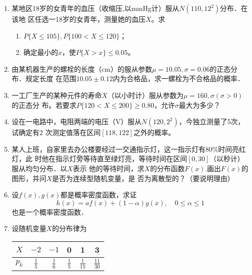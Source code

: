 \documentclass[10pt,a4paper]{article}
\begin{document}
\begin{enumerate}
    \item 某地区18岁的女青年的血压（收缩压,以mmHg计）服从$N(110,12^2)$分布．在该地
    区任选一18岁的女青年，测量她的血压$X$。求
    \begin{enumerate}
        \item $P\{X\leq 105\},P\{100<X\leq 120\}$；
        \item 确定最小的$x$，使$P\{X>x\}\leq 0.05$。
    \end{enumerate}


    \item 由某机器生产的螺栓的长度（cm）的服从参数$\mu=10.05,\sigma=0.06$的正态分布．规定长度
    在范围$10.05\pm 0.12$内为合格品，求一螺栓为不合格品的概率．


    \item 一工厂生产的某种元件的寿命$X$（以小时计）服从参数为$\mu=160,\sigma(\sigma >0)$的正态分
    布。若要求$P\{120<X\leq 200\}\geq 0.80$，允许$\sigma$最大为多少？



    \item 设在一电路中，电阻两端的电压（V）服从$N(120,2^2)$，今独立测量了5次，试确定有2
    次测定值落在区间$[118,122]$之外的概率。


    \item 某人上班，自家里去办公楼要经过一交通指示灯，这一指示灯有80\%时间亮红灯，此
    时他在指示灯旁等待直至绿灯亮，等待时间在区间$[0,30]$（以秒计）服从均匀分布．以$X$表示
    他的等待时间，求$X$的分布函数$F(x)$.画出$F(x)$的图形，并问$X$是否为连续型随机变量，是
    否为离散型的？（要说明理由）


    \item 设$f(x),g(x)$都是概率密度函数，求证
    $$h(x)=af(x)+(1-\alpha)g(x),\quad 0\leq \alpha \leq 1$$
    也是一个概率密度函数．


    \item 设随机变量$X$的分布律为   
    \renewcommand{\arraystretch}{1.5}
    \begin{table}[H]\centering
        \begin{tabular}{c|ccccc}
        
            $X$   & $-2$            & $-1$            & 0             & 1              & 3               \\ \hline
        $p_k$ & $\displaystyle{\frac{1}{5}}$ & $\displaystyle{\frac{1}{6}}$ & $\displaystyle{\frac{1}{5}}$ & $\displaystyle{\frac{1}{15}}$ & $\displaystyle{\frac{11}{30}}$ 
        \end{tabular}
    \end{table}
 


\end{enumerate}
\end{document}
